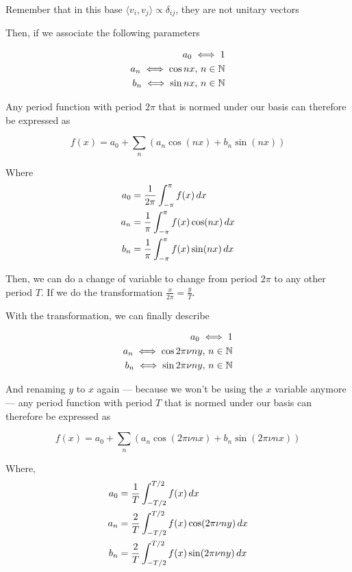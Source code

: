 \documentclass[../main/main.tex]{subfiles}
\begin{document}
	Remember that in this base $\langle v_{i},v_{j}\!\rangle \propto \delta_{ij}$, they are not unitary vectors

	Then, if we associate the following parameters

	\begin{align*}
	a_{0} \iff {1}\\
	a_{n} \iff {\cos nx},\, n \in \mathbb{N}\\
	b_{n} \iff {\sin nx} ,\,n \in \mathbb{N}\\
	\end{align*}

	Any period function with period $2\pi$ that is normed under our basis can therefore be expressed as

	\begin{equation}
	f(x) = a_{0} + \sum_{n}\left(a_{n} \cos (nx) + b_{n} \sin(nx)\right)
	\end{equation}


	Where
	\begin{align}
	a_{0} &= \frac{1}{2\pi} \fourierint{f(x)} \\
	a_{n} &= \frac{1}{\pi} \fourierint{f(x) \cos(nx)} \\
	b_{n} &= \frac{1}{\pi} \fourierint{f(x) \sin(nx)}
	\end{align}

	Then, we can do a change of variable to change from period $2\pi$ to any other period $T$. If we do the transformation $\frac{x}{2\pi} = \frac{y}{T}$.

	With the transformation, we can finally describe


	\begin{align*}
	a_{0} \iff {1}\\
	a_{n} \iff {\cos 2\pi \nu n y},\, n \in \mathbb{N}\\
	b_{n} \iff {\sin 2\pi \nu n y} ,\,n \in \mathbb{N}\\
	\end{align*}

	And renaming $y$ to $x$ again --- because we won't be using the $x$ variable anymore --- any period function with period $T$ that is normed under our basis can therefore be expressed as

	\begin{equation}
	f(x) = a_{0} + \sum_{n}\left(a_{n} \cos ( 2\pi \nu n x) + b_{n} \sin( 2\pi \nu n x)\right)
	\end{equation}


	Where,
	\begin{align}
	a_{0} &= \frac{1}{T} \fourier[-T/2][T/2]{f(x)} \\
	a_{n} &= \frac{2}{T} \fourier[-T/2][T/2]{f(x) \cos(2\pi \nu n y)} \\
	b_{n} &= \frac{2}{T} \fourier[-T/2][T/2]{f(x) \sin(2\pi \nu n y)}
	\end{align}
\end{document}
